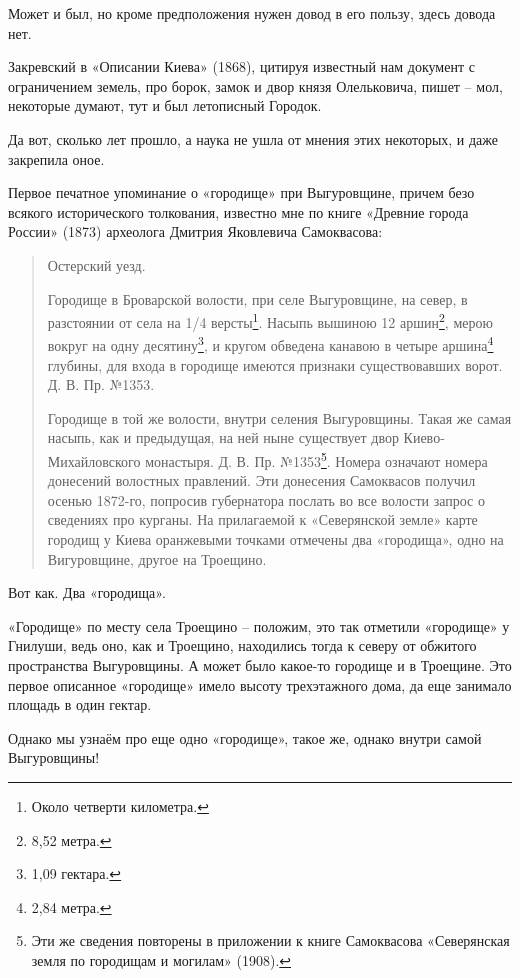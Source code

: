 Может и был, но кроме предположения нужен довод в его пользу, здесь довода нет.

Закревский в «Описании Киева» (1868), цитируя известный нам документ с ограничением земель, про борок, замок и двор князя Олельковича, пишет – мол, некоторые думают, тут и был летописный Городок.

Да вот, сколько лет прошло, а наука не ушла от мнения этих некоторых, и даже закрепила оное.

Первое печатное упоминание о «городище» при Выгуровщине, причем безо всякого исторического толкования, известно мне по книге «Древние города России» (1873) археолога Дмитрия Яковлевича Самоквасова:


\begin{quotation}
Остерский уезд.

Городище в Броварской волости, при селе Выгуровщине, на север, в разстоянии от села на 1/4 версты\footnote{Около четверти километра.}. Насыпь вышиною 12 аршин\footnote{8,52 метра.}, мерою вокруг на одну десятину\footnote{1,09 гектара.}, и кругом обведена канавою в четыре аршина\footnote{2,84 метра.} глубины, для входа в городище имеются признаки существовавших ворот. Д. В. Пр. №1353.

Городище в той же волости, внутри селения Выгуровщины. Такая же самая насыпь, как и предыдущая, на ней ныне существует двор Киево-Михайловского монастыря. Д. В. Пр. №1353\footnote{Эти же сведения повторены в приложении к книге Самоквасова «Северянская земля по городищам и могилам» (1908).}. Номера означают номера донесений волостных правлений. Эти донесения Самоквасов получил осенью 1872-го, попросив губернатора послать во все волости запрос о сведениях про курганы. На прилагаемой к «Северянской земле» карте городищ у Киева оранжевыми точками отмечены два «городища», одно на Вигуровщине, другое на Троещино.
\end{quotation}

Вот как. Два «городища».

«Городище» по месту села Троещино – положим, это так отметили «городище» у Гнилуши, ведь оно, как и Троещино, находились тогда к северу от обжитого пространства Выгуровщины. А может было какое-то городище и в Троещине. Это первое описанное «городище» имело высоту трехэтажного дома, да еще занимало площадь в один гектар.

Однако мы узнаём про еще одно «городище», такое же, однако внутри самой Выгуровщины!

